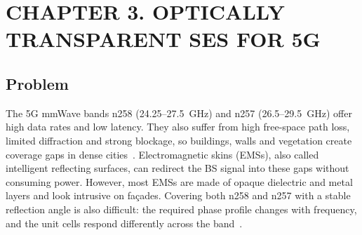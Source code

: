 \section*{CHAPTER 3. OPTICALLY TRANSPARENT SES FOR 5G}
\setcounter{section}{3}
\setcounter{subsection}{0}
\setcounter{equation}{0}
\setcounter{theorem}{0}
\setcounter{figure}{0}
\setcounter{table}{0}

\subsection{Problem}
The 5G mmWave bands n258 (24.25--27.5~GHz) and n257 (26.5--29.5~GHz) offer high data rates and low latency. They also suffer from high free-space path loss, limited diffraction and strong blockage, so buildings, walls and vegetation create coverage gaps in dense cities~\cite{AlNuaimi2026}. Electromagnetic skins (EMSs), also called intelligent reflecting surfaces, can redirect the BS signal into these gaps without consuming power. However, most EMSs are made of opaque dielectric and metal layers and look intrusive on fa\c{c}ades. Covering both n258 and n257 with a stable reflection angle is also difficult: the required phase profile changes with frequency, and the unit cells respond differently across the band~\cite{AlNuaimi2026}.

